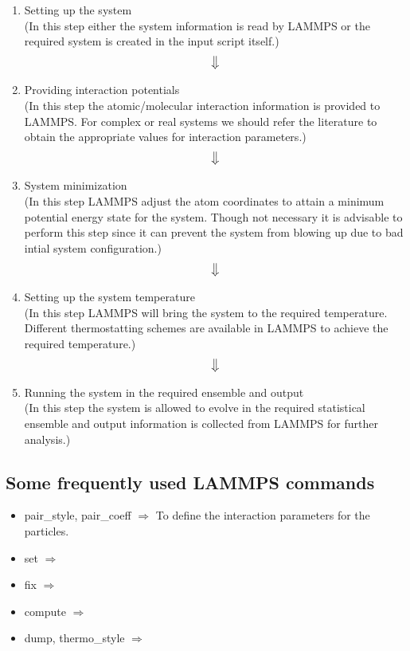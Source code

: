 \documentclass[12pt]{article}
\begin{document}
\begin{enumerate}
\centering
\item Setting up the system\\
(In this step either the system information is read by LAMMPS or 
the required system is created in the input script itself.)
$$\big\Downarrow$$
\item Providing interaction potentials \\
(In this step the atomic/molecular interaction information is provided to LAMMPS.
For complex or real systems we should refer the literature to obtain the 
appropriate values for interaction parameters.) \\
$$\big\Downarrow$$ 
\item System minimization \\
(In this step LAMMPS adjust the atom coordinates to attain a minimum potential energy state for 
the system. Though not necessary it is advisable to perform this step since it can prevent the 
system from blowing up due to bad intial system configuration.) \\
$$\big\Downarrow$$
\item Setting up the system temperature \\
(In this step LAMMPS will bring the system to the required temperature.
Different thermostatting schemes are available in LAMMPS to achieve the required temperature.) \\
$$\big\Downarrow$$
\item Running the system in the required ensemble and output \\
(In this step the system is allowed to evolve in the required statistical ensemble and 
output information is collected from LAMMPS for further analysis.)

\end{enumerate}

\newpage
\subsection{Some frequently used LAMMPS commands}
\begin{itemize}
\item pair\_style, pair\_coeff $\Rightarrow$ To define the interaction parameters for the particles.
\item set $\Rightarrow$
\item fix $\Rightarrow$
\item compute $\Rightarrow$
\item dump, thermo\_style $\Rightarrow$
\end{itemize}
\end{document}
